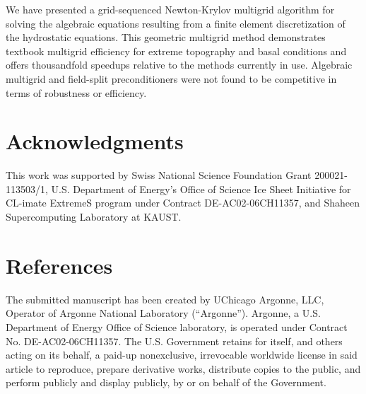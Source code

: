 \documentclass[3p]{elsarticle}
\begin{document}
We have presented a grid-sequenced Newton-Krylov multigrid algorithm for solving the algebraic equations resulting from a finite element discretization of the hydrostatic equations.
This geometric multigrid method demonstrates textbook multigrid efficiency for extreme topography and basal conditions and offers thousandfold speedups relative to the methods currently in use.
Algebraic multigrid and field-split preconditioners were not found to be competitive in terms of robustness or efficiency.

\section*{Acknowledgments} This work was supported by Swiss National Science Foundation Grant 200021-113503/1, U.S. Department of Energy's Office of Science Ice Sheet Initiative for CL-imate ExtremeS program under Contract DE-AC02-06CH11357, and Shaheen Supercomputing Laboratory at KAUST.

\section*{References}




The submitted manuscript has been created by UChicago Argonne, LLC,
Operator of Argonne National Laboratory (``Argonne'').  Argonne, a
U.S. Department of Energy Office of Science laboratory, is operated
under Contract No. DE-AC02-06CH11357.  The U.S. Government retains for
itself, and others acting on its behalf, a paid-up nonexclusive,
irrevocable worldwide license in said article to reproduce, prepare
derivative works, distribute copies to the public, and perform
publicly and display publicly, by or on behalf of the Government.
\end{document}
